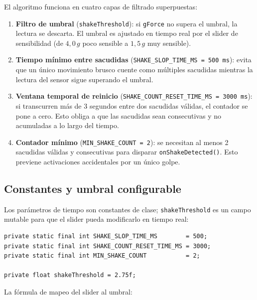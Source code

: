\documentclass[12pt, a4paper]{article}
\begin{document}
El algoritmo funciona en cuatro capas de filtrado superpuestas:

\begin{enumerate}
  \item \textbf{Filtro de umbral} (\texttt{shakeThreshold}): si
        \texttt{gForce} no supera el umbral, la lectura se descarta. El umbral
        es ajustado en tiempo real por el slider de sensibilidad (de
        $4{,}0\,g$ poco sensible a $1{,}5\,g$ muy sensible).

  \item \textbf{Tiempo m\'inimo entre sacudidas}
        (\texttt{SHAKE\_SLOP\_TIME\_MS = 500\,ms}): evita que un \'unico
        movimiento brusco cuente como m\'ultiples sacudidas mientras la
        lectura del sensor sigue superando el umbral.

  \item \textbf{Ventana temporal de reinicio}
        (\texttt{SHAKE\_COUNT\_RESET\_TIME\_MS = 3000\,ms}): si transcurren
        m\'as de 3 segundos entre dos sacudidas v\'alidas, el contador se pone
        a cero. Esto obliga a que las sacudidas sean consecutivas y no
        acumuladas a lo largo del tiempo.

  \item \textbf{Contador m\'inimo} (\texttt{MIN\_SHAKE\_COUNT = 2}): se
        necesitan al menos 2 sacudidas v\'alidas y consecutivas para disparar
        \texttt{onShakeDetected()}. Esto previene activaciones accidentales por
        un \'unico golpe.
\end{enumerate}

\subsection{Constantes y umbral configurable}

Los par\'ametros de tiempo son constantes de clase; \texttt{shakeThreshold}
es un campo mutable para que el slider pueda modificarlo en tiempo real:

\begin{lstlisting}[caption={Constantes del algoritmo de detecci\'on --- \texttt{MainActivity.java}}]
private static final int SHAKE_SLOP_TIME_MS        = 500;
private static final int SHAKE_COUNT_RESET_TIME_MS = 3000;
private static final int MIN_SHAKE_COUNT           = 2;

private float shakeThreshold = 2.75f;
\end{lstlisting}

La f\'ormula de mapeo del slider al umbral:
\end{document}
